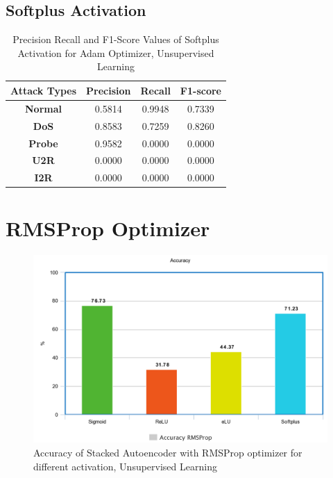 \documentclass[12pt, a4paper]{report}
\begin{document}
\begin{appendices}
   \subsection{Softplus Activation}
  \begin{table}[h]
		\centering
		\captionsetup{justification=centering,margin=2cm}
		\begin{tabular}{|c|c|c|c|}
		\hline
		\textbf{Attack Types} & \textbf{Precision} & \textbf{Recall} & \textbf{F1-score} \\ \hline
		\textbf{Normal}       & 0.5814             & 0.9948          & 0.7339            \\ \hline
		\textbf{DoS}          & 0.8583             & 0.7259          & 0.8260            \\ \hline
		\textbf{Probe}        & 0.9582             & 0.0000          & 0.0000            \\ \hline
		\textbf{U2R}          & 0.0000             & 0.0000          & 0.0000            \\ \hline
		\textbf{I2R}          & 0.0000             & 0.0000          & 0.0000            \\ \hline
		\end{tabular}
		\caption{Precision Recall and F1-Score Values of Softplus Activation for Adam Optimizer, Unsupervised Learning}
		\label{classification softplus adam tf}
		\end{table} 
\clearpage
\section {RMSProp Optimizer}

  	\begin{figure}[ht]
	\centering
	\captionsetup{justification=centering,margin=2cm}
	\includegraphics[width=13cm]{RMSprop_accuracy_tensorflow.png}
	\caption{ Accuracy of Stacked Autoencoder with RMSProp optimizer for different activation, Unsupervised Learning }
	\label{fig:acc_RMSProp_tf}
	\end{figure}
	

\end{appendices}
\end{document}
